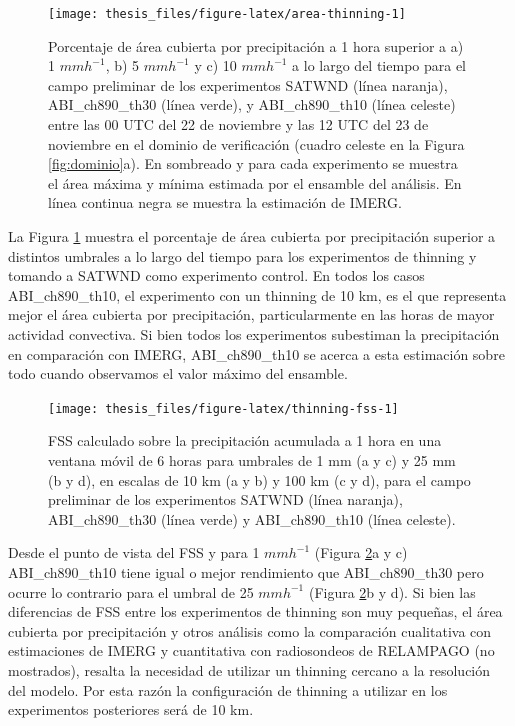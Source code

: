 \documentclass[12pt,oneside,a4paper]{reedthesis}
\begin{document}
\begin{figure}
\texttt{[image: thesis\_files/figure-latex/area-thinning-1]} \caption{Porcentaje de área cubierta por precipitación a 1 hora superior a a) 1 \(mmh^{-1}\), b) 5 \(mmh^{-1}\) y c) 10 \(mmh^{-1}\) a lo largo del tiempo para el campo preliminar de los experimentos SATWND (línea naranja), ABI\_ch890\_th30 (línea verde), y ABI\_ch890\_th10 (línea celeste) entre las 00 UTC del 22 de noviembre y las 12 UTC del 23 de noviembre en el dominio de verificación (cuadro celeste en la Figura \ref{fig:dominio}a). En sombreado y para cada experimento se muestra el área máxima y mínima estimada por el ensamble del análisis. En línea continua negra se muestra la estimación de IMERG.}\label{fig:area-thinning}
\end{figure}
La Figura \ref{fig:area-thinning} muestra el porcentaje de área cubierta por precipitación superior a distintos umbrales a lo largo del tiempo para los experimentos de thinning y tomando a SATWND como experimento control. En todos los casos ABI\_ch890\_th10, el experimento con un thinning de 10 km, es el que representa mejor el área cubierta por precipitación, particularmente en las horas de mayor actividad convectiva. Si bien todos los experimentos subestiman la precipitación en comparación con IMERG, ABI\_ch890\_th10 se acerca a esta estimación sobre todo cuando observamos el valor máximo del ensamble.


\begin{figure}
\texttt{[image: thesis\_files/figure-latex/thinning-fss-1]} \caption{FSS calculado sobre la precipitación acumulada a 1 hora en una ventana móvil de 6 horas para umbrales de 1 mm (a y c) y 25 mm (b y d), en escalas de 10 km (a y b) y 100 km (c y d), para el campo preliminar de los experimentos SATWND (línea naranja), ABI\_ch890\_th30 (línea verde) y ABI\_ch890\_th10 (línea celeste).}\label{fig:thinning-fss}
\end{figure}
Desde el punto de vista del FSS y para 1 \(mm h^{-1}\) (Figura \ref{fig:thinning-fss}a y c) ABI\_ch890\_th10 tiene igual o mejor rendimiento que ABI\_ch890\_th30 pero ocurre lo contrario para el umbral de 25 \(mm h^{-1}\) (Figura \ref{fig:thinning-fss}b y d). Si bien las diferencias de FSS entre los experimentos de thinning son muy pequeñas, el área cubierta por precipitación y otros análisis como la comparación cualitativa con estimaciones de IMERG y cuantitativa con radiosondeos de RELAMPAGO (no mostrados), resalta la necesidad de utilizar un thinning cercano a la resolución del modelo. Por esta razón la configuración de thinning a utilizar en los experimentos posteriores será de 10 km.
\end{document}
